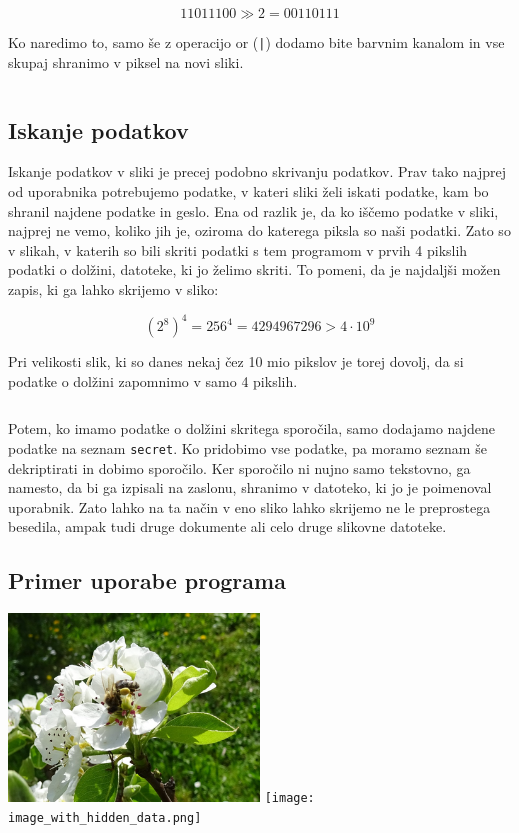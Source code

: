     $$11011100 \gg 2 = 00110111$$

    Ko naredimo to, samo še z operacijo or (\texttt{|}) dodamo bite barvnim kanalom in vse skupaj shranimo v piksel na novi sliki.

    \inputminted[firstline=53, lastline=53, frame=lines]{python}{latex/code_parts.py}


\subsection{Iskanje podatkov}
    Iskanje podatkov v sliki je precej podobno skrivanju podatkov. Prav tako najprej od uporabnika potrebujemo podatke, v kateri sliki želi iskati podatke, kam bo shranil najdene podatke in geslo. Ena od razlik je, da ko iščemo podatke v sliki, najprej ne vemo, koliko jih je, oziroma do katerega piksla so naši podatki. Zato so v slikah, v katerih so bili skriti podatki s tem programom v prvih 4 pikslih podatki o dolžini, datoteke, ki jo želimo skriti. To pomeni, da je najdaljši možen zapis, ki ga lahko skrijemo v sliko:

    $$(2^8)^4 = 256^4 = 4294967296 > 4 \cdot 10^9$$

    Pri velikosti slik, ki so danes nekaj čez 10 mio pikslov je torej dovolj, da si podatke o dolžini zapomnimo v samo 4 pikslih.

    \inputminted[firstline=55, lastline=87, frame=lines]{python}{latex/code_parts.py}

    Potem, ko imamo podatke o dolžini skritega sporočila, samo dodajamo najdene podatke na seznam \texttt{secret}. Ko pridobimo vse podatke, pa moramo seznam še dekriptirati in dobimo sporočilo. Ker sporočilo ni nujno samo tekstovno, ga namesto, da bi ga izpisali na zaslonu, shranimo v datoteko, ki jo je poimenoval uporabnik. Zato lahko na ta način v eno sliko lahko skrijemo ne le preprostega besedila, ampak tudi druge dokumente ali celo druge slikovne datoteke.


\subsection{Primer uporabe programa}
    \includegraphics[width=0.5\textwidth]{image.png}
    \texttt{[image: image\_with\_hidden\_data.png]}

